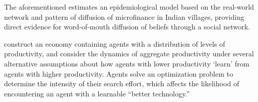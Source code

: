 The aforementioned   estimates an epidemiological model based on the real-world network and pattern of  diffusion of microfinance in Indian villages, providing direct evidence for word-of-mouth diffusion of beliefs through a social network. %

\cite{lucas2014knowledge} construct an economy containing agents with a distribution of levels of productivity, and consider the dynamics of aggregate productivity under several alternative assumptions about how agents with lower productivity `learn' from agents with higher productivity.  %
Agents solve an optimization problem to determine the intensity of their search effort, which affects the likelihood of encountering an agent with a learnable ``better technology.''  %

